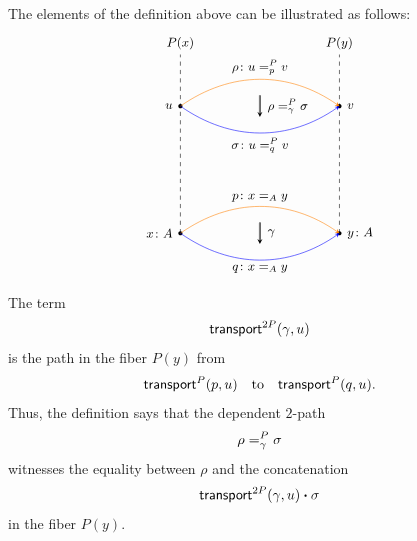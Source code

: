 \begin{rem}
    The elements of the definition above can be illustrated as follows:
    \[
    \begin{tikzpicture}[>=stealth,scale=1.0,font=\small]

        \draw[dashed] (0,0) -- (0,4.5)
            node[above] {$P(x)$};
        \draw[dashed] (4,0) -- (4,4.5)
            node[above] {$P(y)$};

        \fill (0,0) circle (1.5pt)
            node[left=2pt] {$x\colon A$};
        \fill (4,0) circle (1.5pt)
            node[right=2pt] {$y\colon A$};
        
        \fill (0,3.2) circle (1.5pt)
            node[left=2pt] {$u$};
        \fill (4,3.2) circle (1.5pt)
            node[right=2pt] {$v$};
        
        \draw[->,orange] (0,0) to[bend left=35]
            coordinate[midway] (ptop)
            node[midway,above,black] {$p\colon x\eq Ay$}
                (4,0);
        \draw[->,blue] (0,0) to[bend right=35]
            coordinate[midway] (pbot)
            node[midway,below,black] {$q\colon x\eq Ay$}
                (4,0);
        
        \draw[->,
            double,
            shorten >=0.4cm,
            shorten <=0.4cm] (ptop) -- (pbot)
                node[midway,right=2pt] {$\gamma$};
        
        \draw[->,orange] (0,3.2) to[bend left=35]
            coordinate[midway] (utop)
            node[midway,above,black]
                {$\rho\colon u\eqt pPv$} (4,3.2);
        \draw[->,blue] (0,3.2) to[bend right=35]
            coordinate[midway] (ubot)
                node[midway,below,black]
                    {$\sigma\colon u\eqt qPv$} (4,3.2);
        
        \draw[->,
            double,
            shorten >=0.4cm,
            shorten <=0.4cm]
                (utop) -- (ubot)
                node[midway, right=2pt]
                        {$\rho\eqt\gamma P\sigma$};
        
    \end{tikzpicture}
    \]
    The term
    \[
        \mathsf{transport}^{2P}(\gamma,u)
    \]
    is the path in the fiber $P(y)$ from
    \[
        \mathsf{transport}^{P}(p,u)
        \quad\text{to}\quad
        \mathsf{transport}^{P}(q,u).
    \]
    Thus, the definition says that the dependent $2$-path
    \[
        \rho=_{\gamma}^{P}\sigma
    \]
    witnesses the equality between $\rho$ and the concatenation
    \[
        \mathsf{transport}^{2P}(\gamma,u)\mathbin{\boldsymbol{\cdot}}\sigma
    \]
    in the fiber $P(y)$.
\end{rem}


